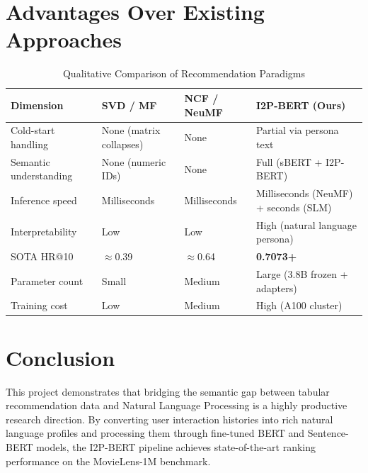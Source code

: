 \documentclass[11pt,a4paper]{article}
\begin{document}
\section{Advantages Over Existing Approaches}

\begin{table}[H]
  \centering
  \caption{Qualitative Comparison of Recommendation Paradigms}
  \label{tab:paradigms}
  \begin{tabular}{@{}p{3.2cm}p{3.5cm}p{3.5cm}p{3.5cm}@{}}
    \toprule
    \textbf{Dimension} & \textbf{SVD / MF} & \textbf{NCF / NeuMF} & \textbf{I2P-BERT (Ours)} \\
    \midrule
    Cold-start handling & None (matrix collapses) & None & Partial via persona text \\
    Semantic understanding & None (numeric IDs) & None & Full (sBERT + I2P-BERT) \\
    Inference speed & Milliseconds & Milliseconds & Milliseconds (NeuMF) + seconds (SLM) \\
    Interpretability & Low & Low & High (natural language persona) \\
    SOTA HR@10 & $\approx$0.39 & $\approx$0.64 & \textbf{0.7073+} \\
    Parameter count & Small & Medium & Large (3.8B frozen + adapters) \\
    Training cost & Low & Medium & High (A100 cluster) \\
    \bottomrule
  \end{tabular}
\end{table}

\section{Conclusion}

This project demonstrates that bridging the semantic gap between tabular recommendation data and Natural Language Processing is a highly productive research direction. By converting user interaction histories into rich natural language profiles and processing them through fine-tuned BERT and Sentence-BERT models, the I2P-BERT pipeline achieves state-of-the-art ranking performance on the MovieLens-1M benchmark.
\end{document}
